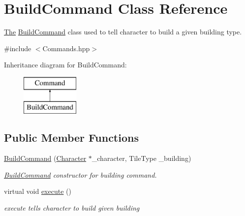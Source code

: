 \hypertarget{class_build_command}{}\section{Build\+Command Class Reference}
\label{class_build_command}


\hyperlink{namespace_the}{The} \hyperlink{class_build_command}{Build\+Command} class used to tell character to build a given building type.  




{\ttfamily \#include $<$Commands.\+hpp$>$}

Inheritance diagram for Build\+Command\+:\begin{figure}[H]
\begin{center}
\leavevmode
\includegraphics[height=2.000000cm]{class_build_command}
\end{center}
\end{figure}
\subsection*{Public Member Functions}
\begin{DoxyCompactItemize}
\item 
\hyperlink{class_build_command_a08ecf64ba0b06349353c9508e7e0c1f1}{Build\+Command} (\hyperlink{class_character}{Character} $\ast$\+\_\+character, Tile\+Type \+\_\+building)
\begin{DoxyCompactList}\small\item\em \hyperlink{class_build_command}{Build\+Command} constructor for building command. \end{DoxyCompactList}\item 
\hypertarget{class_build_command_adac71335554fc606400ddb43f92eae67}{}virtual void \hyperlink{class_build_command_adac71335554fc606400ddb43f92eae67}{execute} ()\label{class_build_command_adac71335554fc606400ddb43f92eae67}

\begin{DoxyCompactList}\small\item\em execute tells character to build given building \end{DoxyCompactList}\end{DoxyCompactItemize}


